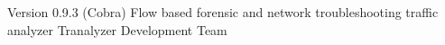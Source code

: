 \documentclass[documentation]{subfiles}
\begin{document}
\trantitle
    {Version 0.9.3 (Cobra)}
    {Flow based forensic and network troubleshooting traffic analyzer}
    {Tranalyzer Development Team}

\end{document}

